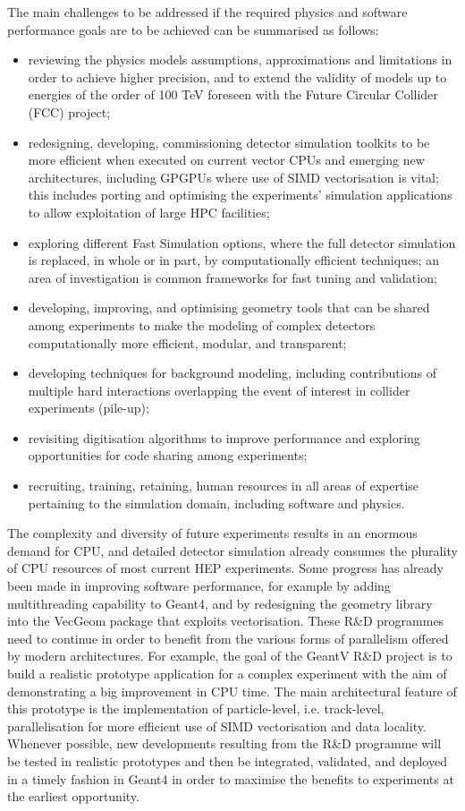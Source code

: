\documentclass[12pt,a4paper]{article}
\begin{document}
The main challenges to be addressed if the required physics and software
performance goals are to be achieved can be summarised as follows:

\begin{itemize}
\item
  reviewing the physics models assumptions, approximations and
  limitations in order to achieve higher precision, and to extend the
  validity of models up to energies of the order of 100 TeV foreseen
  with the Future Circular Collider (FCC) project;
\item
  redesigning, developing, commissioning detector simulation toolkits to
  be more efficient when executed on current vector CPUs and emerging
  new architectures, including GPGPUs where use of SIMD vectorisation is
  vital; this includes porting and optimising the experiments'
  simulation applications to allow exploitation of large HPC facilities;
\item
  exploring different Fast Simulation options, where the full detector
  simulation is replaced, in whole or in part, by computationally
  efficient techniques; an area of investigation is common frameworks
  for fast tuning and validation;
\item
  developing, improving, and optimising geometry tools that can be
  shared among experiments to make the modeling of complex detectors
  computationally more efficient, modular, and transparent;
\item
  developing techniques for background modeling, including contributions
  of multiple hard interactions overlapping the event of interest in
  collider experiments (pile-up);
\item
  revisiting digitisation algorithms to improve performance and
  exploring opportunities for code sharing among experiments;
\item
  recruiting, training, retaining, human resources in all areas of
  expertise pertaining to the simulation domain, including software and
  physics.
\end{itemize}

The complexity and diversity of future experiments results in an
enormous demand for CPU, and detailed detector simulation already
consumes the plurality of CPU resources of most current HEP experiments.
Some progress has already been made in improving software performance,
for example by adding multithreading capability to Geant4, and by
redesigning the geometry library into the VecGeom package that exploits
vectorisation. These R\&D programmes need to continue in order to
benefit from the various forms of parallelism offered by modern
architectures. For example, the goal of the GeantV R\&D project is to
build a realistic prototype application for a complex experiment with
the aim of demonstrating a big improvement in CPU time. The main
architectural feature of this prototype is the implementation of
particle-level, i.e. track-level, parallelisation for more efficient use
of SIMD vectorisation and data locality. Whenever possible, new
developments resulting from the R\&D programme will be tested in
realistic prototypes and then be integrated, validated, and deployed in
a timely fashion in Geant4 in order to maximise the benefits to
experiments at the earliest opportunity.
\end{document}
